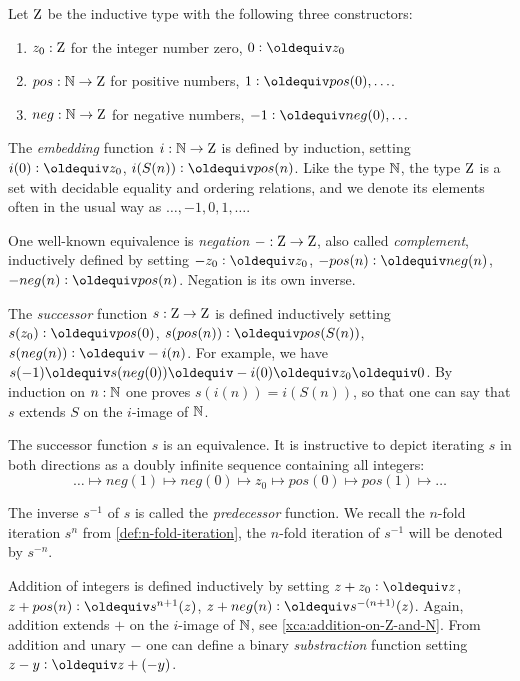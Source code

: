 \begin{definition}\label{def:integers}\label{def:zet}
Let $\mathrm{Z}$ be the inductive type with the following three constructors:
\begin{enumerate}
\item $z_0: \mathrm{Z}$ for the integer number zero, 
$0 \defeq z_0$
\item $pos: \mathbb{N} \to \mathrm{Z}$ for positive numbers,
$1 \defeq pos(0),\ldots$.
\item $neg: \mathbb{N} \to \mathrm{Z}$ for negative numbers, 
$-1 \defeq neg(0),\ldots$
\end{enumerate}

The \emph{embedding} function $i:\mathbb{N}\to\mathrm{Z}$ is defined by induction,
setting $i(0)\defeq z_0$, $i(S(n))\defeq pos(n)$.
Like the type $\mathbb{N}$, the type $\mathrm{Z}$ is a set with decidable equality
and ordering relations,
and we denote its elements often in the usual way as $\ldots,-1,0,1,\ldots$.

One well-known equivalence is \emph{negation} ${-}:\mathrm{Z}\to\mathrm{Z}$, 
also called \emph{complement}, inductively defined by setting 
$-z_0\defeq z_0$, 
$-pos(n)\defeq neg(n)$, 
$-neg(n)\defeq pos(n)$.
Negation is its own inverse.

The \emph{successor} function $s:\mathrm{Z}\to\mathrm{Z}$ is defined inductively setting 
$s(z_0)\defeq pos(0)$, 
$s(pos(n))\defeq pos(S(n))$,
$s(neg(n))\defeq -i(n)$. For example, we have
$s(-1)\jdeq s(neg(0))\jdeq -i(0) \jdeq z_0 \jdeq 0$.
By induction on $n:\mathbb{N}$ one proves $s(i(n))=i(S(n))$, 
so that one can say that $s$ extends $S$
on the $i$-image of $\mathbb{N}$. 

The successor function $s$ is an equivalence.
It is instructive to depict iterating $s$ in both directions as 
a doubly infinite sequence containing all integers:
\[
\ldots \mapsto neg(1) \mapsto neg(0) \mapsto z_0 \mapsto pos(0) \mapsto pos(1) \mapsto \ldots
\]

The inverse $s^{-1}$ of $s$ is called the \emph{predecessor} function.
We recall the $n$-fold iteration $s^n$ from \cref{def:n-fold-iteration},
the $n$-fold iteration of $s^{-1}$ will be denoted by $s^{-n}$.

Addition of integers is defined inductively by setting
$z + z_0\defeq z$, 
$z + pos(n)\defeq s^{n+1}(z)$, 
$z + neg(n)\defeq s^{-(n+1)}(z)$.
Again, addition extends $+$ on the $i$-image of $\mathbb{N}$,
see \cref{xca:addition-on-Z-and-N}. 
From addition and unary $-$ one can define a binary
\emph{substraction} function setting $z-y \defeq z+(-y)$.
\end{definition}

